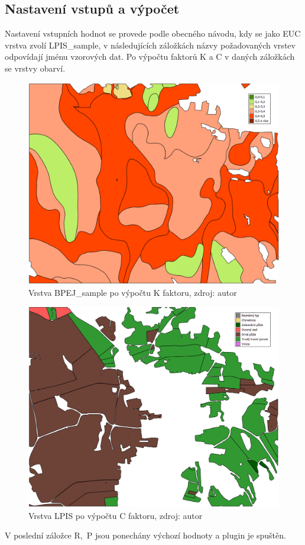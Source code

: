 \subsection{Nastavení vstupů a výpočet} Nastavení vstupních hodnot se
provede podle obecného návodu, kdy se jako EUC vrstva zvolí
LPIS\_sample, v následujících záložkách názvy požadovaných vrstev
odpovídají jménu vzorových dat. Po výpočtu faktorů K a C v daných
záložkách se vrstvy obarví.
\begin{figure}[H] \centering
		\includegraphics[width=.5\textwidth]{./pictures/bpej_layer2.png}
		\caption[Vrstva BPEJ\_sample po výpočtu K
faktoru]{Vrstva BPEJ\_sample po výpočtu K faktoru, zdroj: autor}
		\label{bpej_sample2}
\end{figure}
\begin{figure}[H] \centering
		\includegraphics[width=.5\textwidth]{./pictures/lpis_layer2.png}
		\caption[Vrstva LPIS po výpočtu C faktoru]{Vrstva LPIS
po výpočtu C faktoru, zdroj: autor}
		\label{lpis_sample2}
\end{figure} V poslední záložce R,~P jsou ponechány výchozí hodnoty a
plugin je spuštěn.
\newpage
